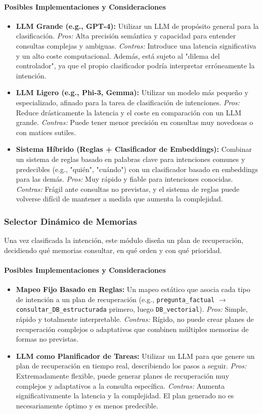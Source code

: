 \documentclass[journal,onecolumn]{IEEEtran}
\begin{document}
\paragraph{Posibles Implementaciones y Consideraciones}
\begin{itemize}
    \item \textbf{LLM Grande (e.g., GPT-4):} Utilizar un LLM de propósito general para la clasificación. \textit{Pros:} Alta precisión semántica y capacidad para entender consultas complejas y ambiguas. \textit{Contras:} Introduce una latencia significativa y un alto coste computacional. Además, está sujeto al "dilema del controlador", ya que el propio clasificador podría interpretar erróneamente la intención.
    \item \textbf{LLM Ligero (e.g., Phi-3, Gemma):} Utilizar un modelo más pequeño y especializado, afinado para la tarea de clasificación de intenciones. \textit{Pros:} Reduce drásticamente la latencia y el coste en comparación con un LLM grande. \textit{Contras:} Puede tener menor precisión en consultas muy novedosas o con matices sutiles.
    \item \textbf{Sistema Híbrido (Reglas + Clasificador de Embeddings):} Combinar un sistema de reglas basado en palabras clave para intenciones comunes y predecibles (e.g., "quién", "cuándo") con un clasificador basado en embeddings para las demás. \textit{Pros:} Muy rápido y fiable para intenciones conocidas. \textit{Contras:} Frágil ante consultas no previstas, y el sistema de reglas puede volverse difícil de mantener a medida que aumenta la complejidad.
\end{itemize}

\subsubsection{Selector Dinámico de Memorias}
Una vez clasificada la intención, este módulo diseña un plan de recuperación, decidiendo qué memorias consultar, en qué orden y con qué prioridad.
\paragraph{Posibles Implementaciones y Consideraciones}
\begin{itemize}
    \item \textbf{Mapeo Fijo Basado en Reglas:} Un mapeo estático que asocia cada tipo de intención a un plan de recuperación (e.g., \texttt{pregunta\_factual} $\rightarrow$ \texttt{consultar\_DB\_estructurada} primero, luego \texttt{DB\_vectorial}). \textit{Pros:} Simple, rápido y totalmente interpretable. \textit{Contras:} Rígido, no puede crear planes de recuperación complejos o adaptativos que combinen múltiples memorias de formas no previstas.
    \item \textbf{LLM como Planificador de Tareas:} Utilizar un LLM para que genere un plan de recuperación en tiempo real, describiendo los pasos a seguir. \textit{Pros:} Extremadamente flexible, puede generar planes de recuperación muy complejos y adaptativos a la consulta específica. \textit{Contras:} Aumenta significativamente la latencia y la complejidad. El plan generado no es necesariamente óptimo y es menos predecible.
\end{itemize}
\end{document}
